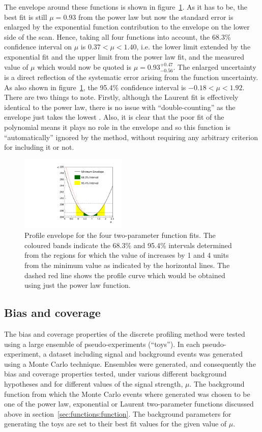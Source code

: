 The envelope around these functions is shown in
figure~\ref{fig:functions:envelope}.
As it has to be, the best fit is still $\mu=0.93$ from the power law
but now the standard error is enlarged by the exponential function
contribution to the
envelope on the lower side of the scan. Hence, taking all four functions into
account, the 68.3\% confidence interval on $\mu$ is
$0.37 < \mu < 1.40 $, i.e. the lower limit extended by 
the exponential fit and the upper limit from the power law fit,
and the measured value of $\mu$ which would now be quoted is 
$\mu = 0.93_{-0.56}^{+0.47}$.
The enlarged uncertainty is a direct reflection of the
systematic error arising from the function uncertainty.
As also shown in figure~\ref{fig:functions:envelope}, the 95.4\% confidence 
interval is $-0.18 < \mu < 1.92$.
There are two things to note. Firstly, although the Laurent fit
is effectively identical to the power law, there is no issue with 
``double-counting'' as the envelope just takes the lowest \nll.
Also, it is clear that the poor fit of the polynomial
means it plays no role in the envelope and so this function is 
``automatically'' ignored by the method,
without requiring any arbitrary criterion for
including it or not.
%
\begin{figure}[tbp]
\centering
\includegraphics[width=0.45\textwidth]{functions/Envelope.pdf}
\caption{Profile \nll envelope for the four two-parameter function fits.
The coloured bands indicate the 68.3\% and 95.4\% intervals determined from the regions 
for which the value of \nll increases by 1 and 4 units from the minimum value as indicated by the horizontal lines. The dashed red line shows the profile \nll
curve which would be obtained using just the power law function.}
\label{fig:functions:envelope}
\end{figure}


\subsection{Bias and coverage}
\label{sec:functions:coverage}

The bias and coverage properties of the discrete profiling method were tested 
using a large ensemble of
pseudo-experiments (``toys''). In each pseudo-experiment, a 
dataset including signal and background events was generated using a Monte Carlo technique. 
Ensembles were generated, and consequently the bias and coverage properties tested, under various different background hypotheses and for different values of the signal strength, $\mu$. The background function from which the Monte Carlo events where generated was chosen to be one of the power law,
exponential or Laurent two-parameter functions discussed above in 
section~\ref{sec:functions:function}. The background parameters for generating the toys are set to their best fit values for the given value of $\mu$. 

